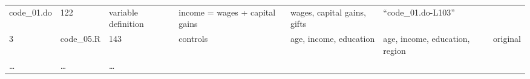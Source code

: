 \documentclass[]{book}
\begin{document}
\begin{longtable}[]{@{}lllllll@{}}
\begin{minipage}[t]{0.07\columnwidth}
code\_01.do\strut
\end{minipage} & \begin{minipage}[t]{0.08\columnwidth}\raggedright
122\strut
\end{minipage} & \begin{minipage}[t]{0.12\columnwidth}\raggedright
variable definition\strut
\end{minipage} & \begin{minipage}[t]{0.19\columnwidth}\raggedright
income = wages + capital gains\strut
\end{minipage} & \begin{minipage}[t]{0.18\columnwidth}\raggedright
wages, capital gains, gifts\strut
\end{minipage} & \begin{minipage}[t]{0.12\columnwidth}\raggedright
``code\_01.do-L103''\strut
\end{minipage}\tabularnewline
\begin{minipage}[t]{0.05\columnwidth}\raggedright
3\strut
\end{minipage} & \begin{minipage}[t]{0.07\columnwidth}\raggedright
code\_05.R\strut
\end{minipage} & \begin{minipage}[t]{0.08\columnwidth}\raggedright
143\strut
\end{minipage} & \begin{minipage}[t]{0.12\columnwidth}\raggedright
controls\strut
\end{minipage} & \begin{minipage}[t]{0.19\columnwidth}\raggedright
age, income, education\strut
\end{minipage} & \begin{minipage}[t]{0.18\columnwidth}\raggedright
age, income, education, region\strut
\end{minipage} & \begin{minipage}[t]{0.12\columnwidth}\raggedright
original\strut
\end{minipage}\tabularnewline
\begin{minipage}[t]{0.05\columnwidth}\raggedright
\ldots{}\strut
\end{minipage} & \begin{minipage}[t]{0.07\columnwidth}\raggedright
\ldots{}\strut
\end{minipage} & \begin{minipage}[t]{0.08\columnwidth}\raggedright
\ldots{}\strut
\end{minipage} & \begin{minipage}[t]{0.12\columnwidth}\raggedright

\end{minipage}
\end{longtable}
\end{document}
